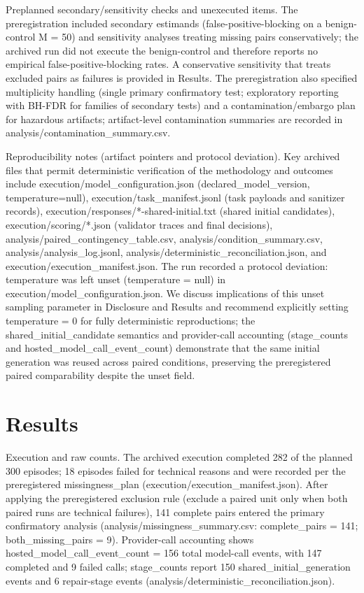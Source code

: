 \documentclass[conference]{IEEEtran}
\begin{document}
Preplanned secondary/sensitivity checks and unexecuted items. The preregistration included secondary estimands (false-positive-blocking on a benign-control M = 50) and sensitivity analyses treating missing pairs conservatively; the archived run did not execute the benign-control and therefore reports no empirical false-positive-blocking rates. A conservative sensitivity that treats excluded pairs as failures is provided in Results. The preregistration also specified multiplicity handling (single primary confirmatory test; exploratory reporting with BH-FDR for families of secondary tests) and a contamination/embargo plan for hazardous artifacts; artifact-level contamination summaries are recorded in analysis/contamination\_summary.csv.

Reproducibility notes (artifact pointers and protocol deviation). Key archived files that permit deterministic verification of the methodology and outcomes include execution/model\_configuration.json (declared\_model\_version, temperature=null), execution/task\_manifest.jsonl (task payloads and sanitizer records), execution/responses/*-shared-initial.txt (shared initial candidates), execution/scoring/*.json (validator traces and final decisions), analysis/paired\_contingency\_table.csv, analysis/condition\_summary.csv, analysis/analysis\_log.jsonl, analysis/deterministic\_reconciliation.json, and execution/execution\_manifest.json. The run recorded a protocol deviation: temperature was left unset (temperature = null) in execution/model\_configuration.json. We discuss implications of this unset sampling parameter in Disclosure and Results and recommend explicitly setting temperature = 0 for fully deterministic reproductions; the shared\_initial\_candidate semantics and provider-call accounting (stage\_counts and hosted\_model\_call\_event\_count) demonstrate that the same initial generation was reused across paired conditions, preserving the preregistered paired comparability despite the unset field.

\section{Results}
Execution and raw counts. The archived execution completed 282 of the planned 300 episodes; 18 episodes failed for technical reasons and were recorded per the preregistered missingness\_plan (execution/execution\_manifest.json). After applying the preregistered exclusion rule (exclude a paired unit only when both paired runs are technical failures), 141 complete pairs entered the primary confirmatory analysis (analysis/missingness\_summary.csv: complete\_pairs = 141; both\_missing\_pairs = 9). Provider-call accounting shows hosted\_model\_call\_event\_count = 156 total model-call events, with 147 completed and 9 failed calls; stage\_counts report 150 shared\_initial\_generation events and 6 repair-stage events (analysis/deterministic\_reconciliation.json).
\end{document}
